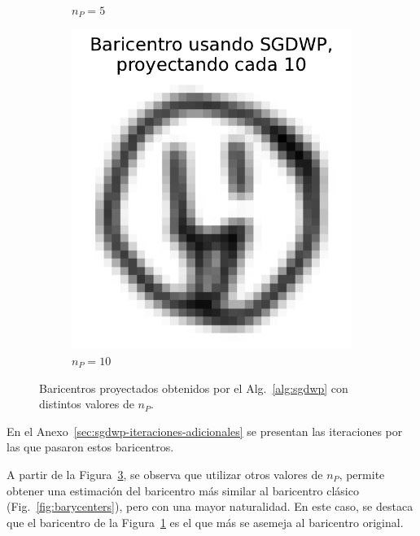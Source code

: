\begin{figure}[htbp]
\begin{subfigure}[b]{0.23\textwidth}
        \caption{$n_P=5$}
        \label{fig:bar-SGDWP-pe-05}
    \end{subfigure}
    \hfill
    \begin{subfigure}[b]{0.23\textwidth}
        \centering
        \includegraphics[width=\textwidth]{img/sgdwp-pe/bar-SGDWP-pe-10.pdf}
        \caption{$n_P=10$}
        \label{fig:bar-SGDWP-pe-10}
    \end{subfigure}
    \caption{Baricentros proyectados obtenidos por el Alg.~\ref{alg:sgdwp} con distintos valores de $n_P$.}
    \label{fig:bar-SGDWP-pe}
\end{figure}

En el Anexo~\ref{sec:sgdwp-iteraciones-adicionales} se presentan las iteraciones por las que pasaron estos baricentros.

A partir de la Figura~\ref{fig:bar-SGDWP-pe}, se observa que utilizar otros valores de $n_P$, permite obtener una estimación del baricentro más similar al baricentro clásico (Fig.~\ref{fig:barycenters}), pero con una mayor naturalidad. En este caso, se destaca que el baricentro de la Figura~\ref{fig:bar-SGDWP-pe-05} es el que más se asemeja al baricentro original.


